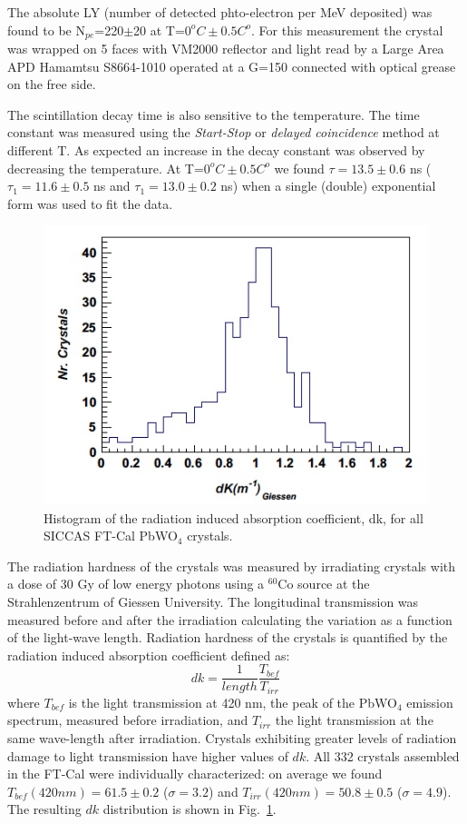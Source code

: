 The absolute LY (number of detected phto-electron per MeV deposited) was found to be N$_{pe}$=220$\pm$20 at T=$0^o C\pm 0.5C^o$. For this measurement  the crystal was wrapped on 5 faces with  VM2000 reflector \cite{vm2000} and light read by a Large Area APD Hamamtsu S8664-1010 operated at a G=150 connected with optical grease on the free side. 

The scintillation decay time is also sensitive to the temperature. The time constant was measured using the {\it Start-Stop} or {\it delayed coincidence} method at different T. As expected an increase in the decay constant was observed by decreasing the temperature. At T=$0^oC\pm 0.5C^o$ we found $\tau=13.5\pm 0.6$ ns ($\tau_1=11.6\pm 0.5$ ns and $\tau_1=13.0\pm 0.2$ ns) when a single (double) exponential form was used to fit the data.



\begin{figure}[th!]
\centering 
\includegraphics[width=0.85\columnwidth]{./fig/dk.jpeg} 
\caption{Histogram of the radiation induced absorption coefficient, dk, for all SICCAS FT-Cal
 PbWO$_4$ crystals.}
\label{fig:dk} 
\end{figure}
The radiation hardness of the crystals was measured  by irradiating crystals with a dose of 30 Gy of  low energy photons using a $^60$Co source at the Strahlenzentrum of Giessen University. The longitudinal transmission was measured before and after the irradiation calculating the variation as a function of the light-wave length. Radiation hardness of the crystals is quantified by the radiation induced absorption coefficient defined as:
\begin{equation}
dk = \frac{1}{length}\frac{T_{bef}}{T_{irr}}
\end{equation}
where $T_{bef}$ is the light transmission at 420 nm, the peak of the PbWO$_4$ emission spectrum, measured before irradiation, and $T_{irr}$ the light transmission at the same wave-length  after irradiation. 
Crystals exhibiting greater levels of radiation damage to light transmission have higher values of $dk$. 
All 332 crystals assembled in the FT-Cal were individually characterized: on average we found 
$T_{bef}(420 nm) = 61.5 \pm 0.2$ ($\sigma=3.2$) and 
$T_{irr}(420 nm) = 50.8 \pm 0.5$ ($\sigma=4.9$). 
The resulting $dk$ distribution is shown in Fig.~\ref{fig:dk}.


